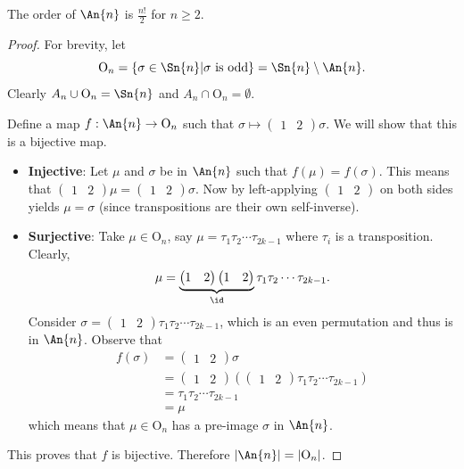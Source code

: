 \begin{proposition}\label{prop-order-of-An}
    The order of $\An{n}$ is $\frac{n!}{2}$ for $n \geq 2$.
\end{proposition}
\begin{proof}
    For brevity, let
    \[
        \mathrm{O}_n = \left\{\sigma \in \Sn{n} \vert \sigma \text{ is odd}\right\} = \Sn{n} \setminus \An{n}.
    \]
    Clearly $A_n \cup \mathrm{O}_n = \Sn{n}$ and $A_n \cap \mathrm{O}_n = \emptyset$.

    Define a map $f: \An{n} \to \mathrm{O}_n$ such that $\sigma \mapsto \begin{pmatrix}1 & 2\end{pmatrix}\sigma$. We will show that this is a bijective map.
    \begin{itemize}
        \item \textbf{Injective}: Let $\mu$ and $\sigma$ be in $\An{n}$ such that $f(\mu) = f(\sigma)$. This means that $\begin{pmatrix}1 & 2\end{pmatrix}\mu = \begin{pmatrix}1 & 2\end{pmatrix}\sigma$. Now by left-applying $\begin{pmatrix}1 & 2\end{pmatrix}$ on both sides yields $\mu = \sigma$ (since transpositions are their own self-inverse).
        
        \item \textbf{Surjective}: Take $\mu \in \mathrm{O}_n$, say $\mu = \tau_1\tau_2\cdots\tau_{2k-1}$ where $\tau_i$ is a transposition. Clearly,
        \[
            \mu = \underbrace{\begin{pmatrix}1 & 2\end{pmatrix}\begin{pmatrix}1 & 2\end{pmatrix}}_{\id}\tau_1\tau_2\cdots\tau_{2k-1}.
        \]
        Consider $\sigma = \begin{pmatrix}1 & 2\end{pmatrix}\tau_1\tau_2\cdots\tau_{2k-1}$, which is an even permutation and thus is in $\An{n}$. Observe that
        \begin{align*}
            f(\sigma) &= \begin{pmatrix}1 & 2\end{pmatrix}\sigma\\
            &= \begin{pmatrix}1 & 2\end{pmatrix}\left(\begin{pmatrix}1 & 2\end{pmatrix}\tau_1\tau_2\cdots\tau_{2k-1}\right)\\
            &= \tau_1\tau_2\cdots\tau_{2k-1}\\
            &= \mu
        \end{align*}
        which means that $\mu \in \mathrm{O}_n$ has a pre-image $\sigma$ in $\An{n}$.
    \end{itemize}
    This proves that $f$ is bijective. Therefore $|\An{n}| = |\mathrm{O}_n|$.
    

\end{proof}
